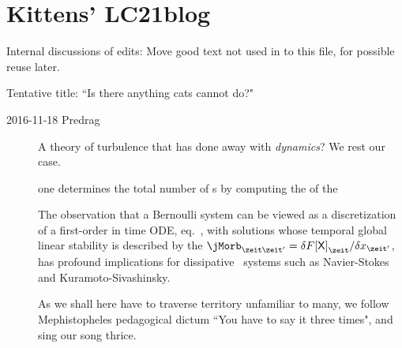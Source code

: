 
\section{Kittens' LC21blog}
\label{s:CL18blog}

Internal discussions of  edits:
Move good text not used in  to this file, for possible
reuse later.

\bigskip

Tentative title:    ``Is there anything cats cannot do?"

\begin{description}

\item[2016-11-18 Predrag]
A theory of turbulence that has done away with \emph{dynamics}?
We rest our case.

one determines the total number of
{\lattstate}s by computing the {\HillDet}  of the
\emph{\jacobianOrb}

The observation that a Bernoulli system can be viewed as a discretization
of a first-order in time ODE, eq.~, with solutions
whose temporal global linear stability is described by the {\jacobianOrb}
$\jMorb_{\zeit\zeit'}=\delta{F[\Xx]}_{\zeit}/\delta\ssp_{\zeit'}$, has
profound implications for dissipative \spt\ systems such as Navier-Stokes
and Kuramoto-Sivashinsky.

As we shall here have to traverse territory unfamiliar to many, we
follow Mephistopheles pedagogical dictum ``You have to say it three
times", and sing our song thrice.

\end{description}

